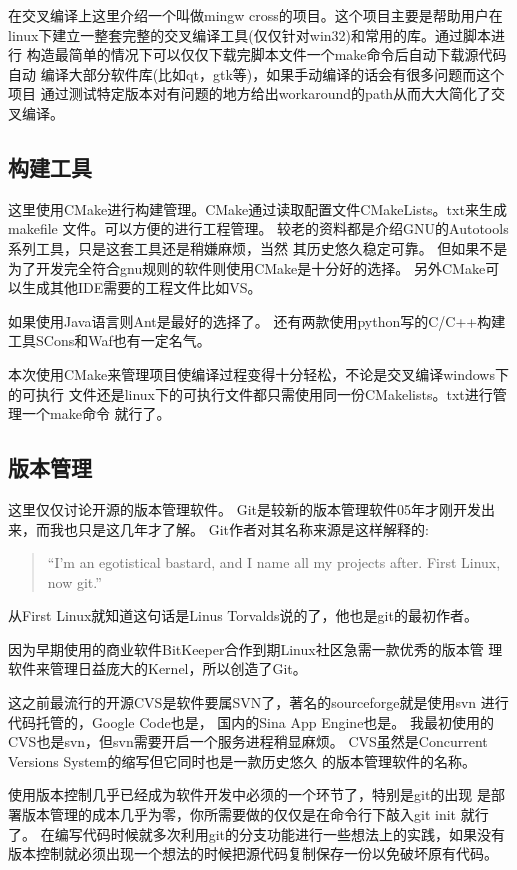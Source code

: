 在交叉编译上这里介绍一个叫做mingw cross的项目。这个项目主要是帮助用户在
linux下建立一整套完整的交叉编译工具(仅仅针对win32)和常用的库。通过脚本进行
构造最简单的情况下可以仅仅下载完脚本文件一个make命令后自动下载源代码自动
编译大部分软件库(比如qt，gtk等)，如果手动编译的话会有很多问题而这个项目
通过测试特定版本对有问题的地方给出workaround的path从而大大简化了交叉编译。

\subsection{构建工具}
这里使用CMake进行构建管理。CMake通过读取配置文件CMakeLists。txt来生成makefile
文件。可以方便的进行工程管理。
较老的资料都是介绍GNU的Autotools系列工具，只是这套工具还是稍嫌麻烦，当然
其历史悠久稳定可靠。
但如果不是为了开发完全符合gnu规则的软件则使用CMake是十分好的选择。
另外CMake可以生成其他IDE需要的工程文件比如VS。

如果使用Java语言则Ant是最好的选择了。
还有两款使用python写的C/C++构建工具SCons和Waf也有一定名气。

本次使用CMake来管理项目使编译过程变得十分轻松，不论是交叉编译windows下的可执行
文件还是linux下的可执行文件都只需使用同一份CMakelists。txt进行管理一个make命令
就行了。

\subsection{版本管理}
这里仅仅讨论开源的版本管理软件。
Git是较新的版本管理软件05年才刚开发出来，而我也只是这几年才了解。
Git作者对其名称来源是这样解释的:
\begin{quote}
``I'm an egotistical bastard, and I name all my projects
after. First Linux, now git.''
\end{quote}
从First Linux就知道这句话是Linus Torvalds说的了，他也是git的最初作者。

因为早期使用的商业软件BitKeeper合作到期Linux社区急需一款优秀的版本管
理软件来管理日益庞大的Kernel，所以创造了Git。

这之前最流行的开源CVS是软件要属SVN了，著名的sourceforge就是使用svn
进行代码托管的，Google Code也是， 国内的Sina App Engine也是。
我最初使用的CVS也是svn，但svn需要开启一个服务进程稍显麻烦。
CVS虽然是Concurrent  Versions System的缩写但它同时也是一款历史悠久
的版本管理软件的名称。

使用版本控制几乎已经成为软件开发中必须的一个环节了，特别是git的出现
是部署版本管理的成本几乎为零，你所需要做的仅仅是在命令行下敲入git init
就行了。
在编写代码时候就多次利用git的分支功能进行一些想法上的实践，如果没有
版本控制就必须出现一个想法的时候把源代码复制保存一份以免破坏原有代码。

